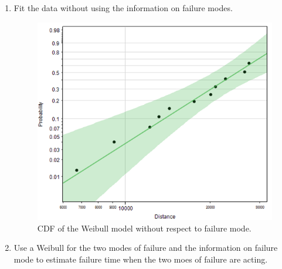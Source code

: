 \documentclass{article}
\begin{document}
\begin{enumerate}
  \begin{enumerate}
  \item Fit the data without using the information on failure modes.\\

\begin{center}
        \FloatBarrier
      \begin{figure}
        \centering
        \includegraphics[width = 5in]{problem5_fit.png}
        \caption{CDF of the Weibull model without respect to failure mode.}
      \end{figure}
      \FloatBarrier
  \end{center}
  
  \item Use a Weibull for the two modes of failure and the information on failure mode to estimate failure time when the two moes of failure are acting.\\


\end{enumerate}
\end{enumerate}
\end{document}
